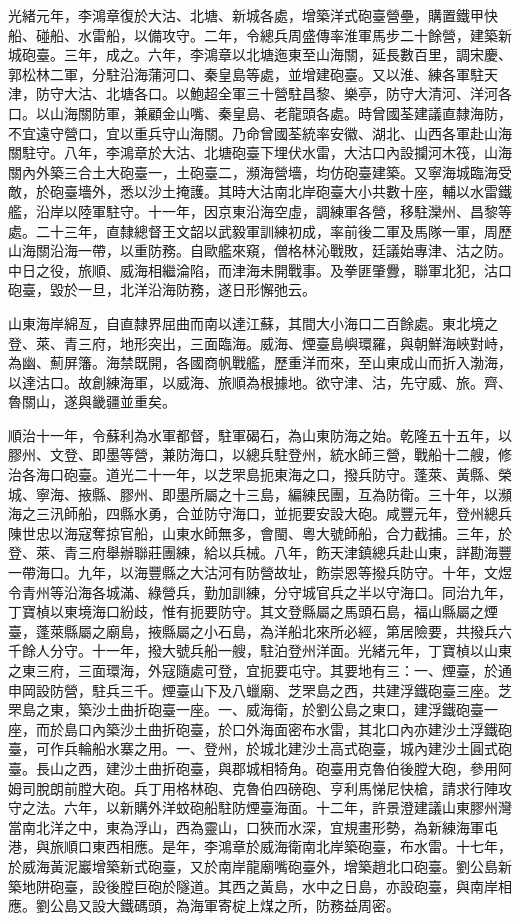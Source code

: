 \begin{pinyinscope}
光緒元年，李鴻章復於大沽、北塘、新城各處，增築洋式砲臺營壘，購置鐵甲快船、碰船、水雷船，以備攻守。二年，令總兵周盛傳率淮軍馬步二十餘營，建築新城砲臺。三年，成之。六年，李鴻章以北塘迤東至山海關，延長數百里，調宋慶、郭松林二軍，分駐沿海蒲河口、秦皇島等處，並增建砲臺。又以淮、練各軍駐天津，防守大沽、北塘各口。以鮑超全軍三十營駐昌黎、樂亭，防守大清河、洋河各口。以山海關防軍，兼顧金山嘴、秦皇島、老龍頭各處。時曾國荃建議直隸海防，不宜遠守營口，宜以重兵守山海關。乃命曾國荃統率安徽、湖北、山西各軍赴山海關駐守。八年，李鴻章於大沽、北塘砲臺下埋伏水雷，大沽口內設攔河木筏，山海關內外築三合土大砲臺一，土砲臺二，瀕海營墻，均仿砲臺建築。又寧海城臨海受敵，於砲臺墻外，悉以沙土掩護。其時大沽南北岸砲臺大小共數十座，輔以水雷鐵艦，沿岸以陸軍駐守。十一年，因京東沿海空虛，調練軍各營，移駐灤州、昌黎等處。二十三年，直隸總督王文韶以武毅軍訓練初成，率前後二軍及馬隊一軍，周歷山海關沿海一帶，以重防務。自歐艦來窺，僧格林沁戰敗，廷議始專津、沽之防。中日之役，旅順、威海相繼淪陷，而津海未開戰事。及拳匪肇釁，聯軍北犯，沽口砲臺，毀於一旦，北洋沿海防務，遂日形懈弛云。

山東海岸綿亙，自直隸界屈曲而南以達江蘇，其間大小海口二百餘處。東北境之登、萊、青三府，地形突出，三面臨海。威海、煙臺島嶼環羅，與朝鮮海峽對峙，為幽、薊屏籓。海禁既開，各國商帆戰艦，歷重洋而來，至山東成山而折入渤海，以達沽口。故創練海軍，以威海、旅順為根據地。欲守津、沽，先守威、旅。齊、魯關山，遂與畿疆並重矣。

順治十一年，令蘇利為水軍都督，駐軍碣石，為山東防海之始。乾隆五十五年，以膠州、文登、即墨等營，兼防海口，以總兵駐登州，統水師三營，戰船十二艘，修治各海口砲臺。道光二十一年，以芝罘島扼東海之口，撥兵防守。蓬萊、黃縣、榮城、寧海、掖縣、膠州、即墨所屬之十三島，編練民團，互為防衛。三十年，以瀕海之三汛師船，四縣水勇，合並防守海口，並扼要安設大砲。咸豐元年，登州總兵陳世忠以海寇奪掠官船，山東水師無多，會閩、粵大號師船，合力截捕。三年，於登、萊、青三府舉辦聯莊團練，給以兵械。八年，飭天津鎮總兵赴山東，詳勘海豐一帶海口。九年，以海豐縣之大沽河有防營故址，飭崇恩等撥兵防守。十年，文煜令青州等沿海各城滿、綠營兵，勤加訓練，分守城官兵之半以守海口。同治九年，丁寶楨以東境海口紛歧，惟有扼要防守。其文登縣屬之馬頭石島，福山縣屬之煙臺，蓬萊縣屬之廟島，掖縣屬之小石島，為洋船北來所必經，第居險要，共撥兵六千餘人分守。十一年，撥大號兵船一艘，駐泊登州洋面。光緒元年，丁寶楨以山東之東三府，三面環海，外寇隨處可登，宜扼要屯守。其要地有三：一、煙臺，於通申岡設防營，駐兵三千。煙臺山下及八蠟廟、芝罘島之西，共建浮鐵砲臺三座。芝罘島之東，築沙土曲折砲臺一座。一、威海衛，於劉公島之東口，建浮鐵砲臺一座，而於島口內築沙土曲折砲臺，於口外海面密布水雷，其北口內亦建沙土浮鐵砲臺，可作兵輪船水寨之用。一、登州，於城北建沙土高式砲臺，城內建沙土圓式砲臺。長山之西，建沙土曲折砲臺，與郡城相犄角。砲臺用克魯伯後膛大砲，參用阿姆司脫朗前膛大砲。兵丁用格林砲、克魯伯四磅砲、亨利馬悌尼快槍，請求行陣攻守之法。六年，以新購外洋蚊砲船駐防煙臺海面。十二年，許景澄建議山東膠州灣當南北洋之中，東為浮山，西為靈山，口狹而水深，宜規畫形勢，為新練海軍屯港，與旅順口東西相應。是年，李鴻章於威海衛南北岸築砲臺，布水雷。十七年，於威海黃泥巖增築新式砲臺，又於南岸龍廟嘴砲臺外，增築趙北口砲臺。劉公島新築地阱砲臺，設後膛巨砲於隧道。其西之黃島，水中之日島，亦設砲臺，與南岸相應。劉公島又設大鐵碼頭，為海軍寄椗上煤之所，防務益周密。


\end{pinyinscope}
